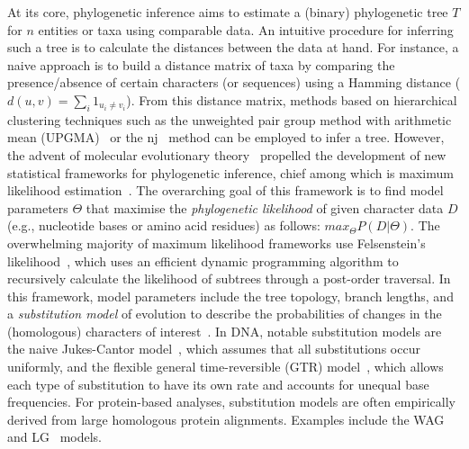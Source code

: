 At its core, phylogenetic inference aims to estimate a (binary) phylogenetic tree $T$ for $n$ entities or taxa using comparable data. An intuitive procedure for inferring such a tree is to calculate the distances between the data at hand. For instance, a naive approach is to build a distance matrix of taxa by comparing the presence/absence of certain characters (or sequences) using a Hamming distance ($d(u,v) = \sum_i 1_{u_i \neq v_i}$). From this distance matrix, methods based on hierarchical clustering techniques such as the unweighted pair group method with arithmetic mean (UPGMA)~\cite{sokal1958} or the \gls{nj}~\cite{saitou1987, lefort2015} method can be employed to infer a tree. However, the advent of molecular evolutionary theory~\cite{zuckerkandl1965, fitch1967, kimura1968, ohta1992} propelled the development of new statistical frameworks for phylogenetic inference, chief among which is maximum likelihood estimation~\cite{felsenstein1981}. The overarching goal of this framework is to find model parameters $\Theta$ that maximise the \emph{phylogenetic likelihood} of given character data $D$ (e.g., nucleotide bases or amino acid residues) as follows: $max_\Theta P(D|\Theta)$. The overwhelming majority of maximum likelihood frameworks use Felsenstein's likelihood~\cite{felsenstein1981}, which uses an efficient dynamic programming algorithm to recursively calculate the likelihood of subtrees through a post-order traversal. In this framework, model parameters include the tree topology, branch lengths, and a \emph{substitution model} of evolution to describe the probabilities of changes in the (homologous) characters of interest~\cite{duchene2024}. In DNA, notable substitution models are the naive Jukes-Cantor model~\cite{jukes1969}, which assumes that all substitutions occur uniformly, and the flexible general time-reversible (GTR) model~\cite{tavare1986}, which allows each type of substitution to have its own rate and accounts for unequal base frequencies. For protein-based analyses, substitution models are often empirically derived from large homologous protein alignments. Examples include the WAG~\cite{whelan2001} and LG~\cite{le2008b} models.
 
